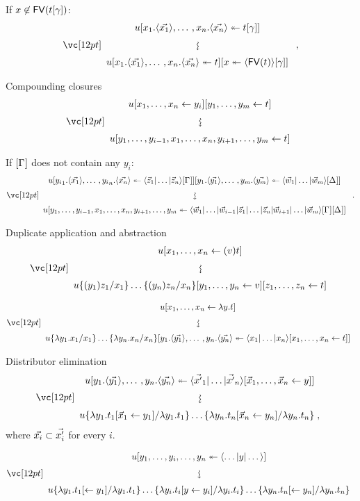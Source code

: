 \documentclass{amsart}
\begin{document}
\bigskip

\noindent
If $x\not\in\FV(t\g)$:
\[
\displayrewrite
  { u\diistr xx{t\g} }
  { u\diistr xxt \diistr* xx{\tup*{\FV(t)}\g } }\;,
\]

\bigskip
\bigskip
\bigskip

\noindent
Compounding closures
\[
\displayrewrite
{ u\share x{y_i}\share[m] yt }
{ u\share* {y_1, \dotsc, y_{i-1}, \vv x, y_{i+1}, \dotsc, y_m}t }
\]

\bigskip

\noindent
If $\G$ does not contain any $y_i$:
\[
\displayrewrite
  { u\diistr x{y_i}{\ttup*z\G}\diistr[m]yy{\ttup*[m]w\G*} }
  { u\diistr*{y_1,\dotsc,y_{i-1},\vv x, y_{i+1}, \dotsc, y_m} y {
  \tup*{\vv*w_1|\dotso|\vv*w_{i-1}|\vv*z_1|\dotso|\vv*z_n|\vv*w_{i+1}|\dotso|\vv*w_m}
  \G\G*} }\;.
\]

\bigskip
\bigskip
\bigskip

\noindent
Duplicate application and abstraction
\[
\displayrewrite
{ u\share x{(v)t} }
{ u\subsapp xyz\share yv\share zt }
\]

\bigskip

\[
\displayrewrite
  { u\share x{\lambda y.t} }
  { u\subsabs xyx\diistr yy{\ttup x\share xt} }
\]

\bigskip
\bigskip
\bigskip

\noindent
Diistributor elimination
\[
\displayrewrite
{ u\diistr yy{\ttup*{x'}\share{\vv*x}y}}
  { u\sub{\lambda y_1.t_1}{\lambda y_1.t_1\share*{\vv*x_1}{y_1}} \dotso
  \sub{\lambda y_n.t_n}{\lambda y_n.t_n\share*{\vv*x_n}{y_n}}\;, }
\]
where $\vv*{x_i}\subset \vv*{x'_i}$ for every $i$.

\bigskip

\[
\displayrewrite
{ u\diistr*{y_1,\dotsc,y_i,\dotsc,y_n}y{\tup*{\dotso|y|\dotso}}}
  { u\sub{\lambda y_1.t_1}{\lambda y_1.t_1\share*{}{y_1}} \dotso
     \sub{\lambda y_i.t_i}{\lambda y_i.t_i\share*{y}{y_i}} \dotso
     \sub{\lambda y_n.t_n}{\lambda y_n.t_n\share*{}{y_n}} }
\]
\end{document}
